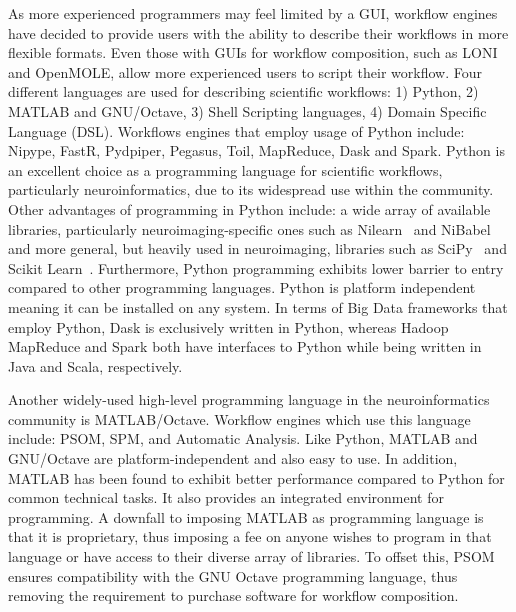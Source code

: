             As more experienced programmers may feel limited by a GUI, workflow
            engines have decided to provide users with the ability to describe
            their workflows in more flexible formats. Even those with GUIs for
            workflow composition, such as LONI and OpenMOLE, allow more
            experienced users to script their workflow. Four different languages
            are used for describing scientific workflows: 1) Python, 2) MATLAB
            and GNU/Octave, 3) Shell Scripting languages, 4) Domain Specific
            Language (DSL). Workflows engines that employ usage of Python
            include: Nipype, FastR, Pydpiper, Pegasus, Toil, MapReduce, Dask and
            Spark. Python is an excellent choice as a programming language for
            scientific workflows, particularly neuroinformatics, due to its
            widespread use within the community. Other advantages of programming
            in Python include: a wide array of available libraries, particularly
            neuroimaging-specific ones such as Nilearn~\cite{nilearn} and
            NiBabel~\cite{matthew_brett_2018_1287921} and more general, but
            heavily used in neuroimaging, libraries such as SciPy~\cite{scipy}
            and Scikit Learn~\cite{pedregosa2011scikit}. Furthermore, Python programming
            exhibits lower barrier to entry compared to other programming languages. Python
            is platform independent meaning it can be installed on any system.
            In terms of Big Data frameworks that employ Python, Dask is
            exclusively written in Python, whereas Hadoop MapReduce and Spark
            both have interfaces to Python while being written in Java and
            Scala, respectively.

            Another widely-used high-level programming language in the
            neuroinformatics community is MATLAB/Octave. Workflow engines which
            use this language include: PSOM, SPM, and Automatic Analysis. Like
            Python, MATLAB and GNU/Octave are platform-independent and also easy
            to use. In addition, MATLAB has been found to exhibit better
            performance compared to Python for common technical tasks. It also
            provides an integrated environment for programming. A downfall to
            imposing MATLAB as programming language is that it is proprietary,
            thus imposing a fee on anyone wishes to program in that language or
            have access to their diverse array of libraries. To offset this,
            PSOM ensures compatibility with the GNU Octave programming language,
            thus removing the requirement to purchase software for workflow
            composition. 

